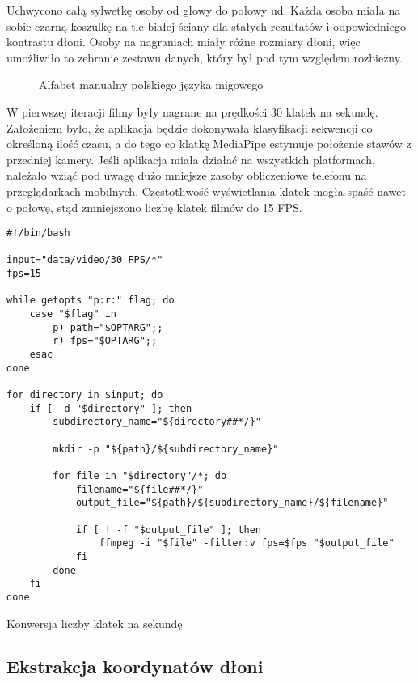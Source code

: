 Uchwycono całą sylwetkę osoby od głowy do połowy ud. Każda osoba miała na sobie czarną koszulkę na tle białej ściany dla stałych rezultatów i odpowiedniego kontrastu dłoni. Osoby na nagraniach miały różne rozmiary dłoni, więc umożliwiło to zebranie zestawu danych, który był pod tym względem rozbieżny.

\begin{figure}[H]
    \centering
    \colorbox{background}{}
    \caption{Alfabet manualny polskiego języka migowego}
    \label{fig:pjm-alphabet}
\end{figure}

W pierwszej iteracji filmy były nagrane na prędkości 30 klatek na sekundę. Założeniem było, że aplikacja będzie dokonywała klasyfikacji sekwencji co określoną ilość czasu, a do tego co klatkę MediaPipe estymuje położenie stawów z przedniej kamery. Jeśli aplikacja miała działać na wszystkich platformach, należało wziąć pod uwagę dużo mniejsze zasoby obliczeniowe telefonu na przeglądarkach mobilnych. Częstotliwość wyświetlania klatek mogła spaść nawet o połowę, stąd zmniejszono liczbę klatek filmów do 15 FPS.

\begin{listing}[H]
    \color{white}
    \begin{verbatim}
#!/bin/bash

input="data/video/30_FPS/*"
fps=15

while getopts "p:r:" flag; do
    case "$flag" in
        p) path="$OPTARG";;
        r) fps="$OPTARG";;
    esac
done

for directory in $input; do
    if [ -d "$directory" ]; then
        subdirectory_name="${directory##*/}"

        mkdir -p "${path}/${subdirectory_name}"

        for file in "$directory"/*; do
            filename="${file##*/}"
            output_file="${path}/${subdirectory_name}/${filename}"

            if [ ! -f "$output_file" ]; then
                ffmpeg -i "$file" -filter:v fps=$fps "$output_file"
            fi
        done
    fi
done
    \end{verbatim}
    \caption{Konwersja liczby klatek na sekundę}
    \label{lst:frame-rate-conversion}
\end{listing}

\subsection{Ekstrakcja koordynatów dłoni}
\label{subsec:keypoint-extraction}

